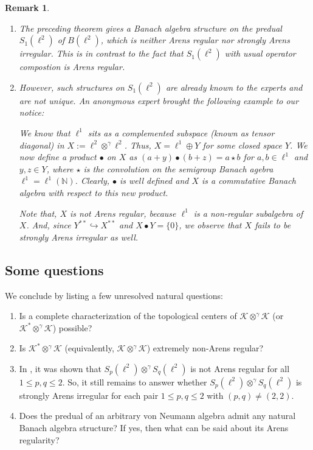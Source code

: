 \documentclass[a4]{amsart}
\theoremstyle{cupthm}
\theoremstyle{cupdefn}
\theoremstyle{cuprem}
\newtheorem{rem}[thm]{Remark}
\numberwithin{equation}{section}
\newcommand{\obp}{\otimes^{\gamma}}
\newcommand{\N}{\mathbb N}
\newcommand{\mK}{\mathcal{K}}
\begin{document}
\begin{rem}\label{predual}
  \begin{enumerate}
\item  The preceding theorem gives a Banach algebra structure on the
  predual $S_1(\ell^2)$ of $B(\ell^2)$, which is neither Arens regular
  nor strongly Arens irregular. This is in contrast to the fact that
  $S_1(\ell^2)$ with usual operator compostion is Arens regular.
\item However, such structures on $S_1(\ell^2)$ are already known to
  the experts and are not unique. An anonymous expert brought the
  following example to our notice:

  We know that $\ell^1$ sits as
a complemented subspace (known as tensor diagonal) in
$X:=\ell^2\obp\ell^2$. Thus, $X=\ell^1\oplus Y$ for some closed space
$Y$. We now define a product $\bullet$ on $X$ as $(a+y)\bullet
(b+z)=a\star b$ for $a,b\in \ell^1$ and $y,z\in Y$, where $\star$ is
the convolution on the semigroup Banach agebra $\ell^1=
\ell^1(\N)$. Clearly, $\bullet$ is well defined and $X$ is a
commutative Banach algebra with respect to this new product.

Note that, $X$ is not Arens regular, because $\ell^1$ is a non-regular
subalgebra of $X$. And, since $Y^{**}\hookrightarrow X^{**}$ and $X
\bullet Y = \{0\}$, we observe that $X$ fails to be strongly Arens
irregular as well.
\end{enumerate}
  \end{rem}


\subsection*{Some questions}
We conclude by listing a few unresolved natural questions:
\begin{enumerate}
\item Is a complete characterization of the topological centers of
  $\mK \obp \mK$ (or $\mK^*\obp\mK$) possible?
\item Is $\mathcal K^* \obp \mathcal K$ (equivalently, $\mK \obp \mK$)
  extremely non-Arens regular?
  \item In \cite{Lav}, it was shown that $S_p(\ell^2) \obp S_q(\ell^2)$
    is not Arens regular for all $1 \leq p, q \leq 2$. So, it still
    remains to answer whether $S_p(\ell^2) \obp S_q(\ell^2)$ is
    strongly Arens irregular for each pair $1 \leq p, q \leq 2$
    with $(p,q) \neq (2,2)$.
\item Does the predual of an arbitrary von Neumann algebra admit any
  natural Banach algebra structure? If yes, then what can be said about its
  Arens regularity?
\end{enumerate}
\end{document}
